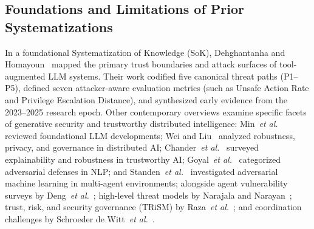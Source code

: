 \subsection{Foundations and Limitations of Prior Systematizations}
\label{subsec:prior_work_limits}

In a foundational Systematization of Knowledge (SoK), Dehghantanha and Homayoun~\cite{dehghantanha2026sok} mapped the primary trust boundaries and attack surfaces of tool-augmented LLM systems. Their work codified five canonical threat paths (P1--P5), defined seven attacker-aware evaluation metrics (such as Unsafe Action Rate and Privilege Escalation Distance), and synthesized early evidence from the 2023--2025 research epoch. Other contemporary overviews examine specific facets of generative security and trustworthy distributed intelligence: Min~\textit{et al.}~\cite{min2023recent} reviewed foundational LLM developments; Wei and Liu~\cite{wei2024trustworthy} analyzed robustness, privacy, and governance in distributed AI; Chander~\textit{et al.}~\cite{chander2024toward} surveyed explainability and robustness in trustworthy AI; Goyal~\textit{et al.}~\cite{goyal2023survey} categorized adversarial defenses in NLP; and Standen~\textit{et al.}~\cite{standen2024adversarial} investigated adversarial machine learning in multi-agent environments; alongside agent vulnerability surveys by Deng~\textit{et al.}~\cite{deng2025ai}; high-level threat models by Narajala and Narayan~\cite{narajala2025securing}; trust, risk, and security governance (TRiSM) by Raza~\textit{et al.}~\cite{raza2026trism}; and coordination challenges by Schroeder de Witt~\textit{et al.}~\cite{dewitt2025open}. 

